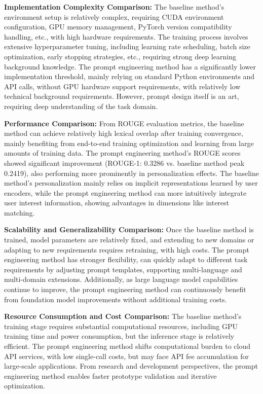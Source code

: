 \documentclass[10pt,a4paper]{article}
\begin{document}
\textbf{Implementation Complexity Comparison:} The baseline method's environment setup is relatively complex, requiring CUDA environment configuration, GPU memory management, PyTorch version compatibility handling, etc., with high hardware requirements. The training process involves extensive hyperparameter tuning, including learning rate scheduling, batch size optimization, early stopping strategies, etc., requiring strong deep learning background knowledge. The prompt engineering method has a significantly lower implementation threshold, mainly relying on standard Python environments and API calls, without GPU hardware support requirements, with relatively low technical background requirements. However, prompt design itself is an art, requiring deep understanding of the task domain.

\textbf{Performance Comparison:} From ROUGE evaluation metrics, the baseline method can achieve relatively high lexical overlap after training convergence, mainly benefiting from end-to-end training optimization and learning from large amounts of training data. The prompt engineering method's ROUGE scores showed significant improvement (ROUGE-1: 0.3286 vs. baseline method peak 0.2419), also performing more prominently in personalization effects. The baseline method's personalization mainly relies on implicit representations learned by user encoders, while the prompt engineering method can more intuitively integrate user interest information, showing advantages in dimensions like interest matching.

\textbf{Scalability and Generalizability Comparison:} Once the baseline method is trained, model parameters are relatively fixed, and extending to new domains or adapting to new requirements requires retraining, with high costs. The prompt engineering method has stronger flexibility, can quickly adapt to different task requirements by adjusting prompt templates, supporting multi-language and multi-domain extensions. Additionally, as large language model capabilities continue to improve, the prompt engineering method can continuously benefit from foundation model improvements without additional training costs.

\textbf{Resource Consumption and Cost Comparison:} The baseline method's training stage requires substantial computational resources, including GPU training time and power consumption, but the inference stage is relatively efficient. The prompt engineering method shifts computational burden to cloud API services, with low single-call costs, but may face API fee accumulation for large-scale applications. From research and development perspectives, the prompt engineering method enables faster prototype validation and iterative optimization.
\end{document}
